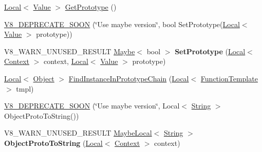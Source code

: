 \begin{DoxyCompactItemize}
\item 
\hyperlink{classv8_1_1Local}{Local}$<$ \hyperlink{classv8_1_1Value}{Value} $>$ \hyperlink{classv8_1_1Object_ae8d3fed7d6dbd667c29cabb3039fe7af}{Get\+Prototype} ()
\item 
\hyperlink{classv8_1_1Object_a34e1ca49ed4944009d8d289e5530dabd}{V8\+\_\+\+D\+E\+P\+R\+E\+C\+A\+T\+E\+\_\+\+S\+O\+O\+N} (\char`\"{}Use maybe version\char`\"{}, bool Set\+Prototype(\hyperlink{classv8_1_1Local}{Local}$<$ \hyperlink{classv8_1_1Value}{Value} $>$ prototype))
\item 
\hypertarget{classv8_1_1Object_a1f1fc25d2a440ad2a8b7d94db04f88fb}{}V8\+\_\+\+W\+A\+R\+N\+\_\+\+U\+N\+U\+S\+E\+D\+\_\+\+R\+E\+S\+U\+L\+T \hyperlink{classv8_1_1Maybe}{Maybe}$<$ bool $>$ {\bfseries Set\+Prototype} (\hyperlink{classv8_1_1Local}{Local}$<$ \hyperlink{classv8_1_1Context}{Context} $>$ context, \hyperlink{classv8_1_1Local}{Local}$<$ \hyperlink{classv8_1_1Value}{Value} $>$ prototype)\label{classv8_1_1Object_a1f1fc25d2a440ad2a8b7d94db04f88fb}

\item 
\hyperlink{classv8_1_1Local}{Local}$<$ \hyperlink{classv8_1_1Object}{Object} $>$ \hyperlink{classv8_1_1Object_ae2ad9fee9db6e0e5da56973ebb8ea2bc}{Find\+Instance\+In\+Prototype\+Chain} (\hyperlink{classv8_1_1Local}{Local}$<$ \hyperlink{classv8_1_1FunctionTemplate}{Function\+Template} $>$ tmpl)
\item 
\hyperlink{classv8_1_1Object_abc26147d5f501bf30217f227c9be4922}{V8\+\_\+\+D\+E\+P\+R\+E\+C\+A\+T\+E\+\_\+\+S\+O\+O\+N} (\char`\"{}Use maybe version\char`\"{}, Local$<$ \hyperlink{classv8_1_1String}{String} $>$ Object\+Proto\+To\+String())
\item 
\hypertarget{classv8_1_1Object_a7a65552d78eff4a1b9755f99167f4255}{}V8\+\_\+\+W\+A\+R\+N\+\_\+\+U\+N\+U\+S\+E\+D\+\_\+\+R\+E\+S\+U\+L\+T \hyperlink{classv8_1_1MaybeLocal}{Maybe\+Local}$<$ \hyperlink{classv8_1_1String}{String} $>$ {\bfseries Object\+Proto\+To\+String} (\hyperlink{classv8_1_1Local}{Local}$<$ \hyperlink{classv8_1_1Context}{Context} $>$ context)\label{classv8_1_1Object_a7a65552d78eff4a1b9755f99167f4255}


\end{DoxyCompactItemize}
